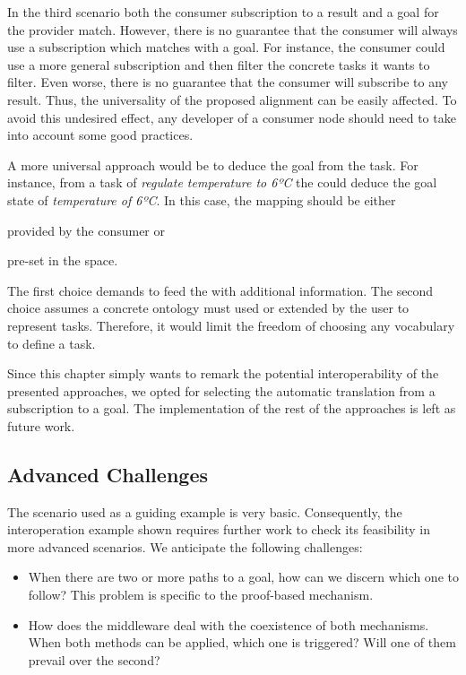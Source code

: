 In the third scenario both the consumer subscription to a result and a goal for the provider match.
However, there is no guarantee that the consumer will always use a subscription which matches with a goal.
For instance, the consumer could use a more general subscription and then filter the concrete tasks it wants to filter.
Even worse, there is no guarantee that the consumer will subscribe to any result.
Thus, the universality of the proposed alignment can be easily affected.
To avoid this undesired effect, any developer of a consumer node should need to take into account some good practices. %


A more universal approach would be to deduce the goal from the task. %
For instance, from a task of \emph{regulate temperature to 6ºC} the \Space{} could deduce the goal state of \emph{temperature of 6ºC}.
In this case, the mapping should be either
\begin{enumerate*}[label=\itshape(\arabic*\upshape)]
  \item provided by the consumer or
  \item pre-set in the space.
\end{enumerate*}
The first choice demands to feed the \Space{} with additional information. %
The second choice assumes a concrete ontology must used or extended by the user to represent tasks.
Therefore, it would limit the freedom of choosing any vocabulary to define a task.


Since this chapter simply wants to remark the potential interoperability of the presented approaches,
we opted for selecting the automatic translation from a subscription to a goal.
The implementation of the rest of the approaches is left as future work.



\subsection{Advanced Challenges} %

The scenario used as a guiding example is very basic.
Consequently, the interoperation example shown requires further work to check its feasibility in more advanced scenarios.
We anticipate the following challenges:
\begin{itemize}
  \item When there are two or more paths to a goal, how can we discern which one to follow?
	This problem is specific to the proof-based mechanism.
  \item How does the middleware deal with the coexistence of both mechanisms.
	When both methods can be applied, which one is triggered?
	Will one of them prevail over the second?
\end{itemize}